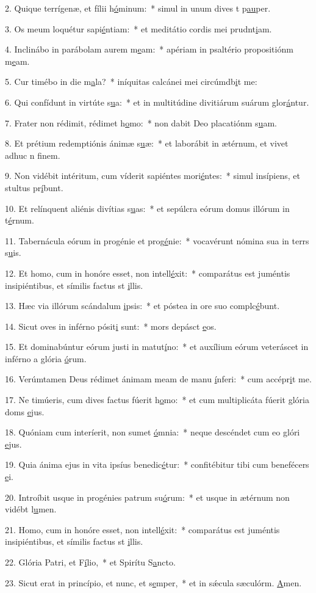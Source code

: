 2. Quique terrígenæ, et fílii h\uline{ó}minum:~* simul in unum dives t p\uline{au}per.\par 
3. Os meum loquétur sapi\uline{é}ntiam:~* et meditátio cordis mei prudnt\uline{i}am.\par 
4. Inclinábo in parábolam aurem m\uline{e}am:~* apériam in psaltério propositiónm m\uline{e}am.\par 
5. Cur timébo in die m\uline{a}la?~* iníquitas calcánei mei circúmdb\uline{i}t me:\par 
6. Qui confídunt in virtúte s\uline{u}a:~* et in multitúdine divitiárum suárum glor\uline{á}ntur.\par 
7. Frater non rédimit, rédimet h\uline{o}mo:~* non dabit Deo placatiónm s\uline{u}am.\par 
8. Et prétium redemptiónis ánimæ s\uline{u}æ:~* et laborábit in ætérnum, et vivet adhuc n f\uline{i}nem.\par 
9. Non vidébit intéritum, cum víderit sapiéntes mori\uline{é}ntes:~* simul insípiens, et stultus pr\uline{í}bunt.\par 
10. Et relínquent aliénis divítias s\uline{u}as:~* et sepúlcra eórum domus illórum in t\uline{é}rnum.\par 
11. Tabernácula eórum in progénie et prog\uline{é}nie:~* vocavérunt nómina sua in terrs s\uline{u}is.\par 
12. Et homo, cum in honóre esset, non intell\uline{é}xit:~* comparátus est juméntis insipiéntibus, et símilis factus st \uline{i}llis.\par 
13. Hæc via illórum scándalum \uline{i}psis:~* et póstea in ore suo complc\uline{é}bunt.\par 
14. Sicut oves in inférno pósit\uline{i} sunt:~* mors depásct \uline{e}os.\par 
15. Et dominabúntur eórum justi in matut\uline{í}no:~* et auxílium eórum veteráscet in inférno a glória \uline{ó}rum.\par 
16. Verúmtamen Deus rédimet ánimam meam de manu \uline{í}nferi:~* cum accépr\uline{i}t me.\par 
17. Ne timúeris, cum dives factus fúerit h\uline{o}mo:~* et cum multiplicáta fúerit glória doms \uline{e}jus.\par 
18. Quóniam cum interíerit, non sumet \uline{ó}mnia:~* neque descéndet cum eo glóri \uline{e}jus.\par 
19. Quia ánima ejus in vita ipsíus benedic\uline{é}tur:~* confitébitur tibi cum benefécers \uline{e}i.\par 
20. Introíbit usque in progénies patrum su\uline{ó}rum:~* et usque in ætérnum non vidébt l\uline{u}men.\par 
21. Homo, cum in honóre esset, non intell\uline{é}xit:~* comparátus est juméntis insipiéntibus, et símilis factus st \uline{i}llis.\par 
22. Glória Patri, et F\uline{í}lio,~* et Spirítu S\uline{a}ncto.\par 
23. Sicut erat in princípio, et nunc, et s\uline{e}mper,~* et in sǽcula sæculórm. \uline{A}men.\par 
